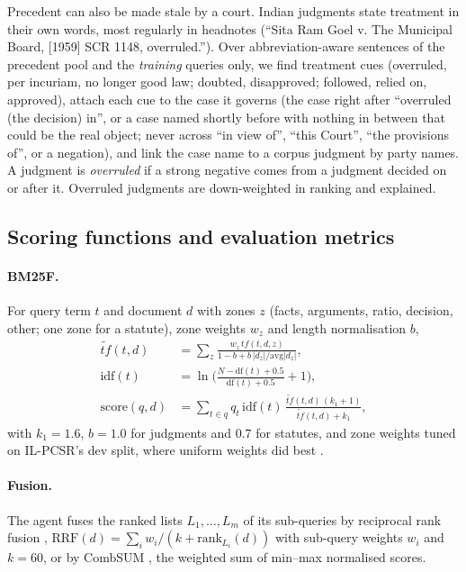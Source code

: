 \documentclass[sigconf,nonacm]{acmart}
\begin{document}
Precedent can also be made stale by a court. Indian judgments state treatment in their own words,
most regularly in headnotes (``Sita Ram Goel v. The Municipal Board, [1959] SCR 1148,
overruled.''). Over abbreviation-aware sentences of the precedent pool and the \emph{training}
queries only, we find treatment cues (overruled, per incuriam, no longer good law; doubted,
disapproved; followed, relied on, approved), attach each cue to the case it governs (the case right
after ``overruled (the decision) in'', or a case named shortly before with nothing in between that
could be the real object; never across ``in view of'', ``this Court'', ``the provisions of'', or a
negation), and link the case name to a corpus judgment by party names. A judgment is
\emph{overruled} if a strong negative comes from a judgment decided on or after it. Overruled
judgments are down-weighted in ranking and explained.

\subsection{Scoring functions and evaluation metrics}\label{sec:formulas}
\paragraph{BM25F.} For query term $t$ and document $d$ with zones $z$ (facts, arguments, ratio,
decision, other; one zone for a statute), zone weights $w_z$ and length normalisation $b$,
\begin{align*}
\tilde{tf}(t,d) &= \sum_{z} \frac{w_z\, tf(t,d,z)}{1-b+b\,|d_z|/\mathrm{avg}|d_z|},\\
\mathrm{idf}(t) &= \ln\Big(\frac{N-\mathrm{df}(t)+0.5}{\mathrm{df}(t)+0.5}+1\Big),\\
\mathrm{score}(q,d) &= \sum_{t\in q} q_t\,\mathrm{idf}(t)\,\frac{\tilde{tf}(t,d)\,(k_1+1)}{\tilde{tf}(t,d)+k_1},
\end{align*}
with $k_1=1.6$, $b=1.0$ for judgments and $0.7$ for statutes, and zone weights tuned on
IL-PCSR's dev split, where uniform weights did best \cite{bm25f}.

\paragraph{Fusion.} The agent fuses the ranked lists $L_1,\dots,L_m$ of its sub-queries by
reciprocal rank fusion \cite{rrf}, $\mathrm{RRF}(d)=\sum_{i} w_i/(k+\mathrm{rank}_{L_i}(d))$ with
sub-query weights $w_i$ and $k=60$, or by CombSUM \cite{combsum}, the weighted sum of min--max
normalised scores.
\end{document}
